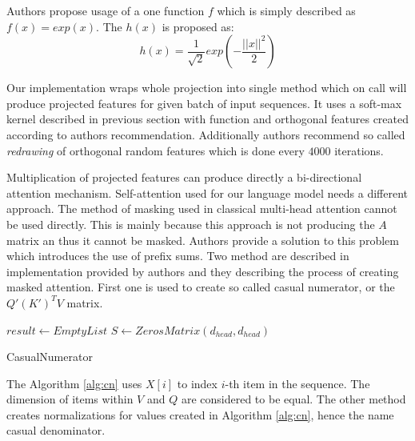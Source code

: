 Authors propose usage of a one function $f$ which is simply described as $f(x) = exp(x)$. The $h(x)$ is proposed as:
\begin{equation}
    h(x) = \frac{1}{\sqrt{2}} exp(-\frac{||x||^2}{2})
\end{equation}

Our implementation wraps whole projection into single method which on call will produce projected features for given batch of input sequences. It uses a soft-max kernel described in previous section with function and orthogonal features created according to authors recommendation. Additionally authors recommend so called \textit{redrawing} of orthogonal random features which is done every $4000$ iterations.

Multiplication of projected features can produce directly a bi-directional attention mechanism. Self-attention used for our language model needs a different approach. The method of masking used in classical multi-head attention cannot be used directly. This is mainly because this approach is not producing the $A$ matrix an thus it cannot be masked. Authors provide a solution to this problem which introduces the use of prefix sums. Two method are described in implementation provided by authors and they describing the process of creating masked attention. First one is used to create so called casual numerator, or the $Q'(K')^T V$ matrix.

\begin{algorithm}[H]
\SetAlgoLined
{}
 $result \leftarrow EmptyList$\;
 $S \leftarrow ZerosMatrix(d_{head}, d_{head})$\;
 \caption{CasualNumerator}
 \label{alg:cn}
\end{algorithm}
The Algorithm \ref{alg:cn} uses $X[i]$ to index $i$-th item in the sequence. The dimension of items within $V$ and $Q$ are considered to be equal. The other method creates normalizations for values created in Algorithm \ref{alg:cn}, hence the name casual denominator. 

